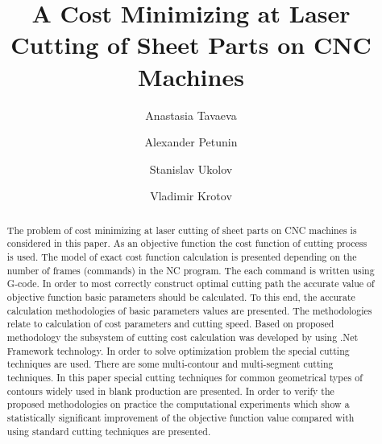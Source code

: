 \documentclass[runningheads]{llncs}
\begin{document}
\title{A Cost Minimizing at Laser Cutting of Sheet Parts on CNC Machines}

\author{
  Anastasia Tavaeva 
  \and
  Alexander Petunin  
  \and
  Stanislav Ukolov  
  \and
  Vladimir Krotov 
}

\maketitle              %

\begin{abstract}
The problem of cost minimizing at laser cutting of sheet parts on CNC machines is considered
in this paper.
As an objective function the cost function of cutting process is used.
The model of exact cost function calculation is presented
depending on the number of frames (commands) in the NC program.
The each command is written using G-code.
In order to most correctly construct optimal cutting path
the accurate value of objective function basic parameters should be calculated.
To this end,
the accurate calculation methodologies of basic parameters values are presented.
The methodologies relate to calculation of cost parameters and cutting speed.
Based on proposed methodology the subsystem of cutting cost calculation was developed by
using .Net Framework technology.
In order to solve optimization problem
the special cutting techniques are used.
There are some multi-contour and multi-segment cutting techniques.
In this paper special cutting techniques
for common geometrical types of contours
widely used in blank production are presented.
In order to verify the proposed methodologies on practice
the computational experiments which show
a statistically significant improvement of the objective function value
compared with using standard cutting techniques are presented.

\end{abstract}
\end{document}

